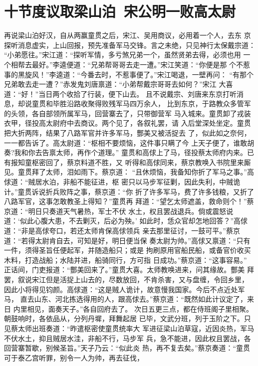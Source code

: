 \chapter{十节度议取梁山泊~宋公明一败高太尉}

再说梁山泊好汉，自从两赢童贯之后，宋江、吴用商议，必用着一个人，去东
京探听消息虚实，上山回报，预先准备军马交锋。言之未绝，只见神行太保戴宗道：
“小弟愿往。”宋江道：“探听军情，多亏煞兄弟一个，虽然贤弟去得，必须也用
一个相帮去最好。”李逵便道：“兄弟帮哥哥去走一遭。”宋江笑道：“你便是那
个不惹事的黑旋风！”李逵道：“今番去时，不惹事便了。”宋江喝退，一壁再问：
“有那个兄弟敢去走一遭？”赤发鬼刘唐禀道：“小弟帮戴宗哥哥去如何？”宋江
大喜道：“好！”当日两个收拾了行装，便下山去。
且不说戴宗、刘唐来东京打听消息，却说童贯和毕胜沿路收聚得败残军马四万余人，
比到东京，于路教众多管军的头领，各自部领所属军马，回营寨去了，只带御营军
马入城来。童贯卸了戎装衣甲，径投高太尉府中去商议。两个见了，各叙礼罢，请
入后堂深处坐定。童贯把大折两阵，结果了八路军官并许多军马，酆美又被活捉去
了，似此如之奈何，一一都告诉了。高太尉道：“枢相不要烦恼，这件事只瞒了今
上天子便了，谁敢胡奏?我和你去告禀太师，再作个道理。”
童贯和高俅上了马，径投蔡太师府内来。已有报知童枢密回了，蔡京料道不胜，又
听得和高俅同来，蔡京教唤入书院里来厮见。童贯拜了太师，泪如雨下。蔡京道：
“且休烦恼，我备知你折了军马之事。”高俅道：“贼居水泊，非船不能征进，枢
密只以马步军征剿，因此失利，中贼诡计。”童贯诉说折兵败阵之事，蔡京道：“你
折了许多军马，费了许多钱粮，又折了八路军官，这事怎敢教圣上得知？”童贯再
拜道：“望乞太师遮盖，救命则个！”蔡京道：“明日只奏道天气暑热，军士不伏
水土，权且罢战退兵。倘或震怒说道：‘似此心腹大患，不去剿灭，后必为殃。’
如此时，恁众官却怎地回答？”高俅道：“非是高俅夸口，若还太师肯保高俅领兵
亲去那里征讨，一鼓可平。”蔡京道：“若得太尉肯自去，可知是好，明日便当保
奏太尉为帅。”高俅又禀道：“只有一件，须得圣旨任便起军，并随造船只；或是
拘刷原用官船民船，或备官价收买木料，打造战船；水陆并进，船骑同行，方可指
日成功。”蔡京道：“这事容易。”
正话间，门吏报道：“酆美回来了。”童贯大喜。太师教唤进来，问其缘故。酆美
拜罢，叙说宋江但是活捉上山去的，尽数放回，不肯杀害，又与盘缠，令回乡里，
因此小将得见钧颜。高俅道：“这是贼人诡计，故意慢我国家。今后不点近处军马，
直去山东、河北拣选得用的人，跟高俅去。”蔡京道：“既然如此计议定了，来日
内里相见，面奏天子。”各自回府去了。
次日五更三点，都在侍班阁子里相聚。朝鼓响时，各依品从，分列丹墀，拜舞起居
已毕，文武分班，列于玉阶之下。只见蔡太师出班奏道：“昨遣枢密使童贯统率大
军进征梁山泊草寇，近因炎热，军马不伏水土，抑且贼居水洼，非船不行，马步军
兵，急不能进，因此权且罢战，各回营寨暂歇，别候圣旨。”天子乃云：“似此炎
热，再不复去矣。”蔡京奏道：“童贯可于泰乙宫听罪，别令一人为帅，再去征伐，
